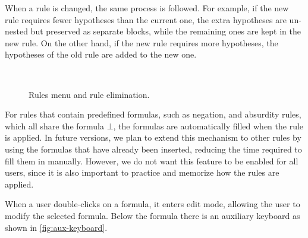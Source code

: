 When a rule is changed, the same process is followed. For example, if the new rule requires fewer hypotheses than the current one, the extra hypotheses are un-nested but preserved as separate blocks, while the remaining ones are kept in the new rule. On the other hand, if the new rule requires more hypotheses, the hypotheses of the old rule are added to the new one.  

\begin{figure}[h]
    \centering
    \begin{minipage}{\linewidth}
        \centering
        \\[0.5em]
    \end{minipage}
    \caption{Rules menu and rule elimination.}
    \label{fig:board-rules}
\end{figure}

For rules that contain predefined formulas, such as negation, and absurdity rules, which all share the formula \(\bot\), the formulas are automatically filled when the rule is applied. In future versions, we plan to extend this mechanism to other rules by using the formulas that have already been inserted, reducing the time required to fill them in manually. However, we do not want this feature to be enabled for all users, since it is also important to practice and memorize how the rules are applied.  

When a user double-clicks on a formula, it enters edit mode, allowing the user to modify the selected formula. Below the formula there is an auxiliary keyboard as shown in \autoref{fig:aux-keyboard}. 

